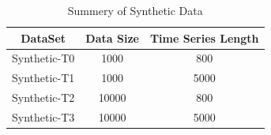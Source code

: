 \begin{table}
\begin{tabular}{ccccccccc}
\bottomrule[1.5pt] 
\end{tabular}
\label{Tab:ClusRes}
\end{table}


\begin{table}[t]
\caption{Summery of Synthetic Data}
\centering

\begin{tabular}{|c|c|c|}
\hline DataSet &  Data Size & Time Series Length\\
\hline Synthetic-T0 & 1000 & 800 \\
\hline Synthetic-T1 & 1000 & 5000 \\
\hline Synthetic-T2 & 10000 & 800 \\
\hline Synthetic-T3 & 10000 & 5000 \\
\hline
\end{tabular}
\label{Tab:SDataScale}
\end{table}


